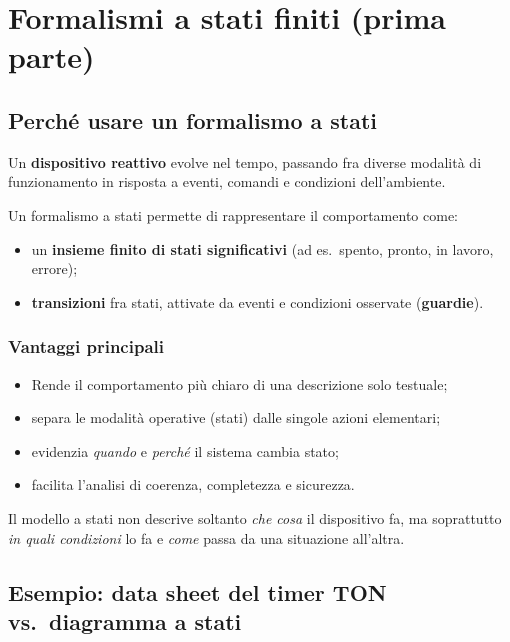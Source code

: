\chapter{Formalismi a stati finiti (prima parte)}
\label{cap:formalismi-1}

\section{Perché usare un formalismo a stati}
Un \textbf{dispositivo reattivo} evolve nel tempo, passando fra diverse modalità di funzionamento in risposta a eventi, comandi e condizioni dell'ambiente.

Un formalismo a stati permette di rappresentare il comportamento come:
\begin{itemize}
    \item un \textbf{insieme finito di stati significativi} (ad es.\ spento, pronto, in lavoro, errore);
    \item \textbf{transizioni} fra stati, attivate da eventi e condizioni osservate (\textbf{guardie}).
\end{itemize}

\subsection{Vantaggi principali}
\begin{itemize}
    \item Rende il comportamento più chiaro di una descrizione solo testuale;
    \item separa le modalità operative (stati) dalle singole azioni elementari;
    \item evidenzia \emph{quando} e \emph{perché} il sistema cambia stato;
    \item facilita l'analisi di coerenza, completezza e sicurezza.
\end{itemize}
Il modello a stati non descrive soltanto \emph{che cosa} il dispositivo fa, ma soprattutto \emph{in quali condizioni} lo fa e \emph{come} passa da una situazione all'altra.

\section{Esempio: data sheet del timer TON vs.\ diagramma a stati}
